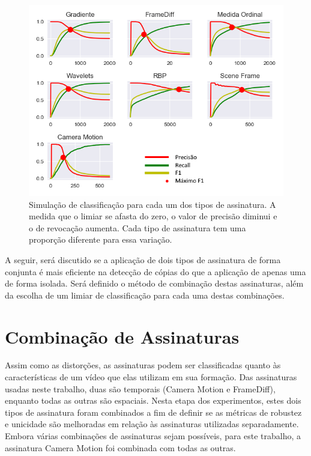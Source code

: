 \begin{figure}[h]
	\centering
	\caption{Simulação de classificação para cada um dos tipos de assinatura. A medida que o limiar se afasta do zero, o valor de precisão diminui e o de revocação aumenta. Cada tipo de assinatura tem uma proporção diferente para essa variação.}
	\label{fig:todos-limiares}
	\includegraphics[width=\textwidth]{dados/figuras/experimentos/todos_final.png}
\end{figure}
 
A seguir, será discutido se a aplicação de dois tipos de assinatura de forma conjunta é mais eficiente na detecção de cópias do que a aplicação de apenas uma de forma isolada. Será definido o método de combinação destas assinaturas, além da escolha de um limiar de classificação para cada uma destas combinações.

\section{Combinação de Assinaturas}

Assim como as distorções, as assinaturas podem ser classificadas quanto às características de um vídeo que elas utilizam em sua formação. Das assinaturas usadas neste trabalho, duas são temporais (Camera Motion e FrameDiff), enquanto todas as outras são espaciais. Nesta etapa dos experimentos, estes dois tipos de assinatura foram combinados a fim de definir se as métricas de robustez e unicidade são melhoradas em relação às assinaturas utilizadas separadamente. Embora várias combinações de assinaturas sejam possíveis, para este trabalho, a assinatura Camera Motion foi combinada com todas as outras. 

